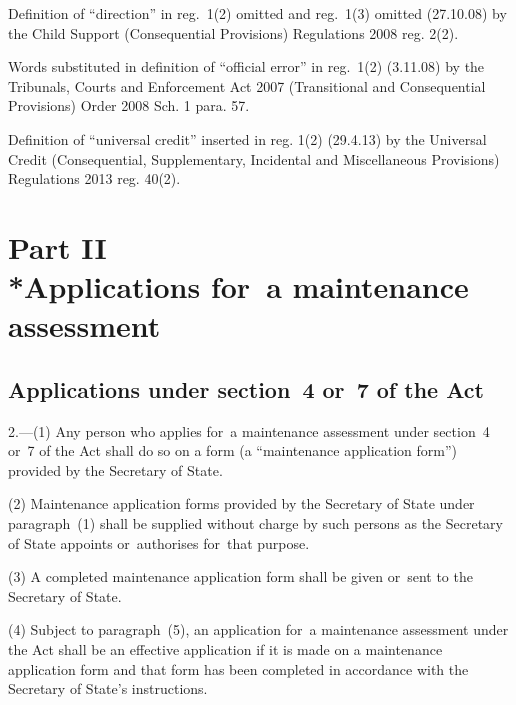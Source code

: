 \documentclass[a4paper,12pt]{article}
\begin{document}
{Definition of ``direction'' in reg.~1(2) omitted and reg.~1(3) omitted (27.10.08) by the Child Support (Consequential Provisions) Regulations 2008 reg. 2(2).

Words substituted in definition of ``official error'' in reg.~1(2) (3.11.08) by the Tribunals, Courts and Enforcement Act 2007 (Transitional and Consequential Provisions) Order 2008 Sch. 1 para. 57.

Definition of ``universal credit'' inserted in reg. 1(2) (29.4.13) by the Universal Credit (Consequential, Supplementary, Incidental and Miscellaneous Provisions) Regulations 2013 reg. 40(2).
}

\section[Part II --- Applications for~a maintenance assessment]{Part II\\*Applications for~a maintenance assessment}

\renewcommand\parthead{--- Part II}

\subsection[2. Applications under section~4
or~7 of the Act]{Applications under section~4
or~7 of the Act}

2.—(1) Any person who applies for~a maintenance assessment under section~4 or~7 of the Act shall do so on a form (a “maintenance application form”) provided by the Secretary of State.

(2) Maintenance application forms provided by the Secretary of State 
under paragraph~(1) shall be supplied without charge by such persons as the Secretary of State appoints or~authorises for~that purpose.

(3) A completed maintenance application form shall be given or~sent to the Secretary of State.

(4) Subject to paragraph~(5), an application for~a maintenance assessment under the Act shall be an effective application if it is made on a maintenance application form and that form has been completed in accordance with the Secretary of State’s instructions.
\end{document}
